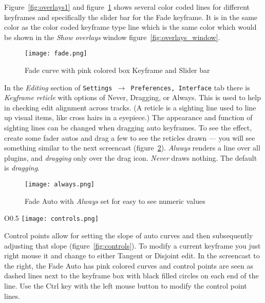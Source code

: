 Figure~\ref{fig:overlays1} and figure~\ref{fig:fade} shows several color coded lines for different key\-fra\-mes and specifically the slider bar for the Fade keyframe.  It is in the same color as the color coded keyframe type line which is the same color which would be shown in the \textit{Show overlays} window figure~\ref{fig:overlays_window}.

\begin{figure}[htpb]
    \centering
    \texttt{[image: fade.png]}
    \caption{Fade curve with pink colored box Keyframe and Slider bar}
    \label{fig:fade}
\end{figure}

In the \textit{Editing} section of \texttt{Settings $\rightarrow$ Preferences, Interface} tab there is \textit{Keyframe reticle} with options of Never, Dragging, or Always.  This is used to help in checking edit alignment across tracks.  (A reticle is a sighting line used to line up visual items, like cross hairs in a eyepiece.)  The appearance and function of sighting lines can be changed when dragging auto keyframes.  To see the effect, create some fader autos and drag a few to see the reticles drawn --- you will see something similar to the next screencast (figure~\ref{fig:always}).  \textit{Always} renders a line over all plugins, and \textit{dragging} only over the drag icon. \textit{Never} draws nothing.  The default is \textit{dragging}.

\begin{figure}[htpb]
    \centering
    \texttt{[image: always.png]}
    \caption{Fade Auto with \textit{Always} set for easy to see numeric values}
    \label{fig:always}
\end{figure}

\begin{wrapfigure}[9]{O}{0.5\linewidth}
    \vspace{-2ex}
    \centering
    \texttt{[image: controls.png]}
    \caption{Fade Auto with Controls}
    \label{fig:controls}
\end{wrapfigure}

Control points allow for setting the slope of auto curves and then
subsequently adjusting that slope (figure~\ref{fig:controls}).  To modify a current keyframe
you just right mouse it and change to either Tangent or Disjoint edit.
In the screencast to the right, the Fade Auto has pink colored curves and control points are seen as dashed lines next to the keyframe box with black filled circles on each end of the line.  Use the Ctrl key with the left mouse button to modify the control point lines.

